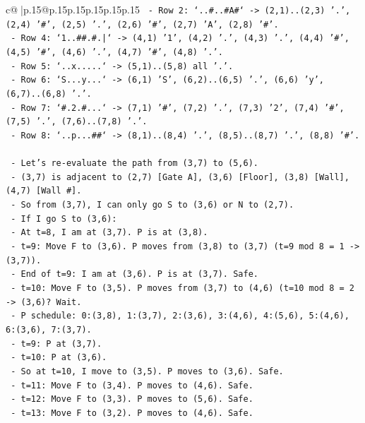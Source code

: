 \documentclass{article}
\begin{document}
{\begin{supertabular}{c@{$\;$}|p{.15\linewidth}@{}p{.15\linewidth}p{.15\linewidth}p{.15\linewidth}p{.15\linewidth}p{.15\linewidth}}
{{{\texttt{       {-} Row 2: `..\#..\#A\#` {-}> (2,1)..(2,3) '.', (2,4) '\#', (2,5) '.', (2,6) '\#', (2,7) 'A', (2,8) '\#'.} \\
\texttt{       {-} Row 4: `1..\#\#.\#.|` {-}> (4,1) '1', (4,2) '.', (4,3) '.', (4,4) '\#', (4,5) '\#', (4,6) '.', (4,7) '\#', (4,8) '.'.} \\
\texttt{       {-} Row 5: `..x.....` {-}> (5,1)..(5,8) all '.'.} \\
\texttt{       {-} Row 6: `S...y...` {-}> (6,1) 'S', (6,2)..(6,5) '.', (6,6) 'y', (6,7)..(6,8) '.'.} \\
\texttt{       {-} Row 7: `\#.2.\#...` {-}> (7,1) '\#', (7,2) '.', (7,3) '2', (7,4) '\#', (7,5) '.', (7,6)..(7,8) '.'.} \\
\texttt{       {-} Row 8: `..p...\#\#` {-}> (8,1)..(8,4) '.', (8,5)..(8,7) '.', (8,8) '\#'.} \\
\\ 
\texttt{   {-} Let's re{-}evaluate the path from (3,7) to (5,6).} \\
\texttt{   {-} (3,7) is adjacent to (2,7) {[}Gate A{]}, (3,6) {[}Floor{]}, (3,8) {[}Wall{]}, (4,7) {[}Wall \#{]}.} \\
\texttt{   {-} So from (3,7), I can only go S to (3,6) or N to (2,7).} \\
\texttt{   {-} If I go S to (3,6):} \\
\texttt{     {-} At t=8, I am at (3,7). P is at (3,8).} \\
\texttt{     {-} t=9: Move F to (3,6). P moves from (3,8) to (3,7) (t=9 mod 8 = 1 {-}> (3,7)).} \\
\texttt{     {-} End of t=9: I am at (3,6). P is at (3,7). Safe.} \\
\texttt{     {-} t=10: Move F to (3,5). P moves from (3,7) to (4,6) (t=10 mod 8 = 2 {-}> (3,6)? Wait.} \\
\texttt{       {-} P schedule: 0:(3,8), 1:(3,7), 2:(3,6), 3:(4,6), 4:(5,6), 5:(4,6), 6:(3,6), 7:(3,7).} \\
\texttt{       {-} t=9: P at (3,7).} \\
\texttt{       {-} t=10: P at (3,6).} \\
\texttt{       {-} So at t=10, I move to (3,5). P moves to (3,6). Safe.} \\
\texttt{     {-} t=11: Move F to (3,4). P moves to (4,6). Safe.} \\
\texttt{     {-} t=12: Move F to (3,3). P moves to (5,6). Safe.} \\
\texttt{     {-} t=13: Move F to (3,2). P moves to (4,6). Safe.} \\
}}}
\end{supertabular}}
\end{document}
